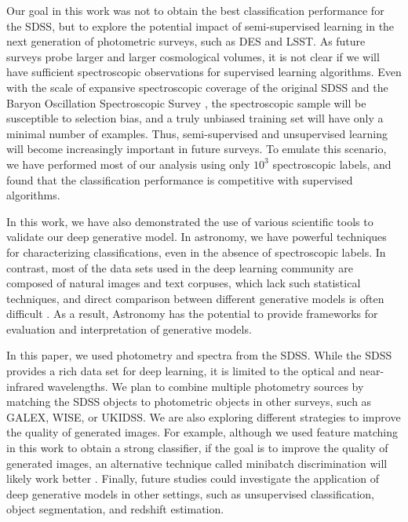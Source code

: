 \documentclass[fleqn,usenatbib]{mnras}
\begin{document}
Our goal in this work was not to obtain the best classification performance for the SDSS,
but to explore the potential impact of semi-supervised learning in the next generation of photometric surveys, such as DES and LSST.
As future surveys probe larger and larger cosmological volumes, it is not clear if we will have sufficient spectroscopic observations
for supervised learning algorithms.
Even with the scale of expansive spectroscopic coverage of the original SDSS and the Baryon Oscillation Spectroscopic Survey
\citep[BOSS;][]{dawson2012baryon}, the spectroscopic sample will be susceptible to selection bias,
and a truly unbiased training set will have only a minimal number of examples.
Thus, semi-supervised and unsupervised learning will become increasingly important in future surveys.
To emulate this scenario, we have performed most of our analysis using only $10^3$ spectroscopic labels, and
found that the classification performance is competitive with supervised algorithms.

In this work, we have also demonstrated the use of various scientific tools to validate our deep generative model.
In astronomy, we have powerful techniques for characterizing classifications, even in the absence of spectroscopic labels.
In contrast, most of the data sets used in the deep learning community are composed of natural images and text corpuses,
which lack such statistical techniques,
and direct comparison between different generative models is often difficult 
\citep{theis2016note}.
As a result, Astronomy has the potential to provide frameworks for evaluation and interpretation of generative models.

In this paper, we used photometry and spectra from the SDSS.
While the SDSS provides a rich data set for deep learning,
it is limited to the optical and near-infrared wavelengths.
We plan to combine multiple photometry sources by matching the SDSS objects to
photometric objects in other surveys, such as GALEX, WISE, or UKIDSS.
We are also exploring different strategies to improve the quality of generated images.
For example, although we used feature matching in this work to obtain a strong classifier,
if the goal is to improve the quality of generated images, an alternative technique
called minibatch discrimination will likely work better \citep{salimans2016improved,dai2017good}.
Finally, future studies could investigate the application of deep generative models in other settings,
such as unsupervised classification, object segmentation, and redshift estimation.
\end{document}
